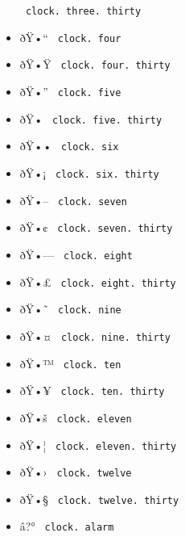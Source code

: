 \begin{itemize}
{  \texttt{\ clock.\ three.\ thirty\ }}
\item
  \label{symbol-clock.four}{{ ðŸ•`` }
  \texttt{\ clock.\ four\ }}
\item
  \label{symbol-clock.four.thirty}{{ ðŸ•Ÿ }
  \texttt{\ clock.\ four.\ thirty\ }}
\item
  \label{symbol-clock.five}{{ ðŸ•'' }
  \texttt{\ clock.\ five\ }}
\item
  \label{symbol-clock.five.thirty}{{ ðŸ• }
  \texttt{\ clock.\ five.\ thirty\ }}
\item
  \label{symbol-clock.six}{{ ðŸ•• }
  \texttt{\ clock.\ six\ }}
\item
  \label{symbol-clock.six.thirty}{{ ðŸ•¡ }
  \texttt{\ clock.\ six.\ thirty\ }}
\item
  \label{symbol-clock.seven}{{ ðŸ•-- }
  \texttt{\ clock.\ seven\ }}
\item
  \label{symbol-clock.seven.thirty}{{ ðŸ•¢ }
  \texttt{\ clock.\ seven.\ thirty\ }}
\item
  \label{symbol-clock.eight}{{ ðŸ•--- }
  \texttt{\ clock.\ eight\ }}
\item
  \label{symbol-clock.eight.thirty}{{ ðŸ•£ }
  \texttt{\ clock.\ eight.\ thirty\ }}
\item
  \label{symbol-clock.nine}{{ ðŸ•˜ }
  \texttt{\ clock.\ nine\ }}
\item
  \label{symbol-clock.nine.thirty}{{ ðŸ•¤ }
  \texttt{\ clock.\ nine.\ thirty\ }}
\item
  \label{symbol-clock.ten}{{ ðŸ•™ }
  \texttt{\ clock.\ ten\ }}
\item
  \label{symbol-clock.ten.thirty}{{ ðŸ•¥ }
  \texttt{\ clock.\ ten.\ thirty\ }}
\item
  \label{symbol-clock.eleven}{{ ðŸ•š }
  \texttt{\ clock.\ eleven\ }}
\item
  \label{symbol-clock.eleven.thirty}{{ ðŸ•¦ }
  \texttt{\ clock.\ eleven.\ thirty\ }}
\item
  \label{symbol-clock.twelve}{{ ðŸ•› }
  \texttt{\ clock.\ twelve\ }}
\item
  \label{symbol-clock.twelve.thirty}{{ ðŸ•§ }
  \texttt{\ clock.\ twelve.\ thirty\ }}
\item
  \label{symbol-clock.alarm}{{ â?° }
  \texttt{\ clock.\ alarm\ }}

\end{itemize}
